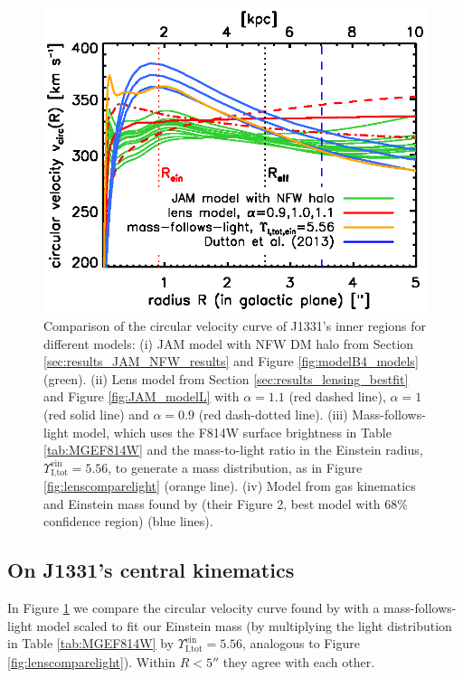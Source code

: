 \documentclass[useAMS,usenatbib]{mnras}
\begin{document}
\begin{figure}
\centering
\includegraphics[width=0.9\linewidth]{fig/B4_jam_profiles_errors_short_vcirc.ps}
\caption{Comparison of the circular velocity curve of J1331's inner regions for different models: (i) JAM model with NFW DM halo from Section \ref{sec:results_JAM_NFW_results} and Figure \ref{fig:modelB4_models} (green). (ii) Lens model from Section \ref{sec:results_lensing_bestfit} and Figure \ref{fig:JAM_modelL} with $\alpha = 1.1$ (red dashed line), $\alpha = 1$ (red solid line) and $\alpha=0.9$ (red dash-dotted line). (iii) Mass-follows-light model, which uses the F814W surface brightness in Table \ref{tab:MGEF814W} and the mass-to-light ratio in the Einstein radius, $\Upsilon^\text{ein}_\text{I,tot} = 5.56$, to generate a mass distribution, as in Figure \ref{fig:lenscomparelight} (orange line).  (iv) Model from gas kinematics and Einstein mass found by \citet{SWELLSV} (their Figure 2, best model with 68\% confidence region) (blue lines).}
\label{fig:vcirc_comparison}
\end{figure}

\subsection{On J1331's central kinematics}

In Figure \ref{fig:vcirc_comparison} we compare the circular velocity curve found by \citet{SWELLSV} with a mass-follows-light model scaled to fit our Einstein mass (by multiplying the light distribution in Table \ref{tab:MGEF814W} by $\Upsilon_\text{I,tot}^\text{ein} = 5.56$, analogous to Figure \ref{fig:lenscomparelight}). Within $R < 5''$ they agree with each other. 
\end{document}
